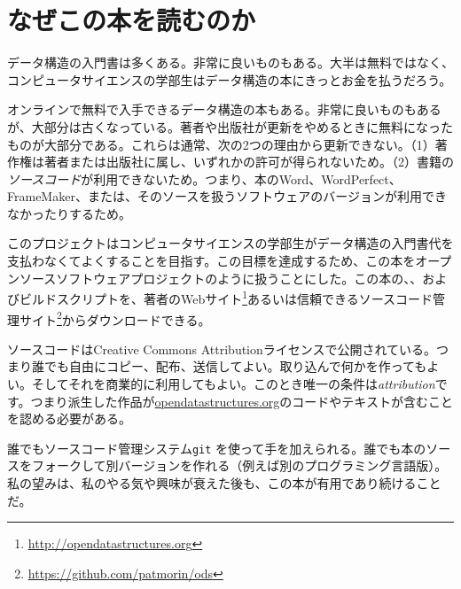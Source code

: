 \chapter*{なぜこの本を読むのか}

データ構造の入門書は多くある。非常に良いものもある。大半は無料ではなく、コンピュータサイエンスの学部生はデータ構造の本にきっとお金を払うだろう。

オンラインで無料で入手できるデータ構造の本もある。非常に良いものもあるが、大部分は古くなっている。著者や出版社が更新をやめるときに無料になったものが大部分である。これらは通常、次の2つの理由から更新できない。（1）著作権は著者または出版社に属し、いずれかの許可が得られないため。（2）書籍の\emph{ソースコード}が利用できないため。つまり、本のWord、WordPerfect、FrameMaker、または、そのソースを扱うソフトウェアのバージョンが利用できなかったりするため。

このプロジェクトはコンピュータサイエンスの学部生がデータ構造の入門書代を支払わなくてよくすることを目指す。この目標を達成するため、この本をオープンソースソフトウェアプロジェクトのように扱うことにした。この本の、、およびビルドスクリプトを、著者のWebサイト\footnote {\url{http://opendatastructures.org}}あるいは信頼できるソースコード管理サイト\footnote {\url{https://github.com/patmorin/ods}}からダウンロードできる。

ソースコードはCreative Commons Attributionライセンスで公開されている。つまり誰でも自由にコピー、配布、送信してよい。取り込んで何かを作ってもよい。そしてそれを商業的に利用してもよい。このとき唯一の条件は\emph{attribution}です。つまり派生した作品が\url{opendatastructures.org}のコードやテキストが含むことを認める必要がある。

誰でもソースコード管理システム\texttt{git} を使って手を加えられる。誰でも本のソースをフォークして別バージョンを作れる（例えば別のプログラミング言語版）。私の望みは、私のやる気や興味が衰えた後も、この本が有用であり続けることだ。
